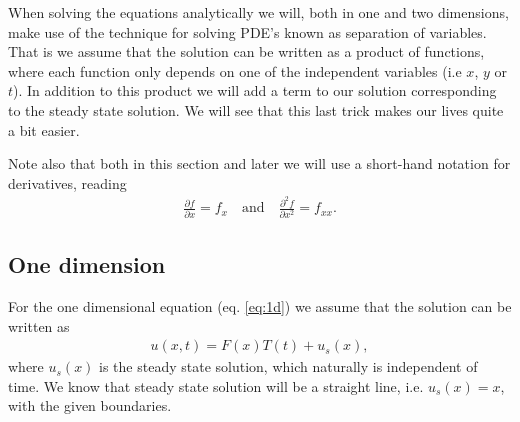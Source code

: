 \documentclass[12pt, a4paper]{article}
\begin{document}
When solving the equations analytically we will, both in one and two dimensions, make use of the 
technique for solving PDE's known as separation of variables. That is we assume that the solution 
can be written as a product of functions, where each function only depends on one of the independent 
variables (i.e $x$, $y$ or $t$). In addition to this product we will add a term to our solution 
corresponding to the steady state solution. We will see that this last trick makes our lives quite a 
bit easier.  

Note also that both in this section and later we will use a short-hand notation for derivatives, 
reading 
\begin{align*}
\frac{\partial f}{\partial x} = f_x \quad \text{and} \quad \frac{\partial^2 f}{\partial x^2} = f_{xx}. 
\end{align*}

\subsection{One dimension}

For the one dimensional equation (eq. \ref{eq:1d}) we assume that the solution can be written as 
\begin{align*}
u(x,t) = F(x)T(t) + u_s(x), 
\end{align*}
where $u_s(x)$ is the steady state solution, which naturally is independent of time. We know that 
steady state solution will be a straight line, i.e. $u_s(x)=x$, with the given boundaries. 
\end{document}
